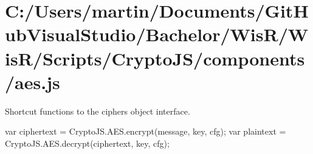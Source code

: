 \hypertarget{_c_1_2_users_2martin_2_documents_2_git_hub_visual_studio_2_bachelor_2_wis_r_2_wis_r_2_scripts_2_2216be9667131f049aed9bcc721c5125}{}\section{C\+:/\+Users/martin/\+Documents/\+Git\+Hub\+Visual\+Studio/\+Bachelor/\+Wis\+R/\+Wis\+R/\+Scripts/\+Crypto\+J\+S/components/aes.\+js}
Shortcut functions to the cipher\textquotesingle{}s object interface.

\begin{DoxyVerb}var ciphertext = CryptoJS.AES.encrypt(message, key, cfg);
var plaintext  = CryptoJS.AES.decrypt(ciphertext, key, cfg);\end{DoxyVerb}



